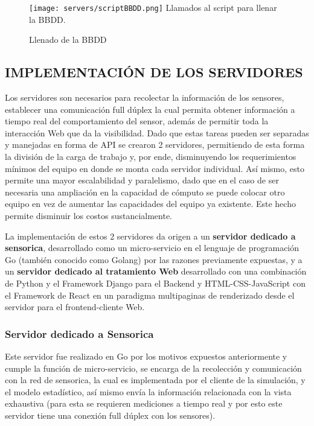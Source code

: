 	\begin{figure}[htb]
		\centering
        \caption{Llenado de la BBDD}
        \texttt{[image: servers/scriptBBDD.png]}
        Llamados al script para llenar la BBDD.    \label{img:scriptBBDD}
	\end{figure}

\subsection{IMPLEMENTACIÓN DE LOS SERVIDORES}

    Los servidores son necesarios para recolectar la información de los sensores,
    establecer una comunicación full dúplex la cual permita obtener información
    a tiempo real del comportamiento del sensor, además de permitir toda la
    interacción Web que da la visibilidad. Dado que estas tareas pueden ser
    separadas y manejadas en forma de API se crearon 2 servidores, permitiendo
    de esta forma la división de la carga de trabajo y, por ende, disminuyendo los
    requerimientos mínimos del equipo en donde se monta cada servidor individual.
    Así mismo, esto permite una mayor escalabilidad y paralelismo, dado que en el
    caso de ser necesaria una ampliación en la capacidad de cómputo se puede colocar
    otro equipo en vez de aumentar las capacidades del equipo ya existente. Este
    hecho permite disminuir los costos sustancialmente.

    La implementación de estos 2 servidores da origen a un \textbf{servidor dedicado
    a sensorica}, desarrollado como un micro-servicio en el lenguaje de programación
    Go (también conocido como Golang) por las razones previamente expuestas, y
    a un \textbf{servidor dedicado al tratamiento Web} desarrollado con una
    combinación de Python y el Framework Django para el Backend y HTML-CSS-JavaScript
    con el Framework de React en un paradigma multipaginas de renderizado desde
    el servidor para el frontend-cliente Web.

    \subsubsection{Servidor dedicado a Sensorica}


    Este servidor fue realizado en Go por los motivos expuestos anteriormente y
    cumple la función de micro-servicio, se encarga de la recolección y comunicación
    con la red de sensorica, la cual es implementada por el cliente de la simulación,
    y el modelo estadístico, así mismo envía la información relacionada con la
    vista exhaustiva (para esta se requieren mediciones a tiempo real y por esto
    este servidor tiene una conexión full dúplex con los sensores).

